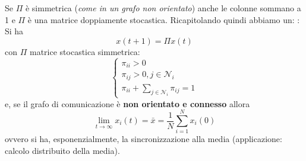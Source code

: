 Se $\Pi$ \`e simmetrica (\textit{come in un grafo non orientato}) anche le colonne sommano a 1 e $\Pi$ \`e una matrice doppiamente stocastica. Ricapitolando quindi abbiamo un:
: Si ha
\begin{equation}
\label{eqn:consdisc}
x(t+1) = \Pi x(t)
\end{equation} con $\Pi$ matrice stocastica simmetrica:
\begin{equation}
\begin{cases}
    \pi_{ii} > 0 \\
    \pi_{ij} > 0, j \in \mathcal{N}_i \\
    \pi_{ii} + \sum_{j \in \mathcal{N}_i} \pi_{ij} = 1
\end{cases}
\end{equation} e, se il grafo di comunicazione \`e \textbf{non orientato e connesso} allora
\begin{equation}
\lim_{t \to \infty} x_i(t) = \bar{x} = \frac{1}{N} \sum_{i=1}^N x_i(0)
\end{equation} ovvero si ha, esponenzialmente, la sincronizzazione alla media (applicazione: calcolo distribuito della media).

